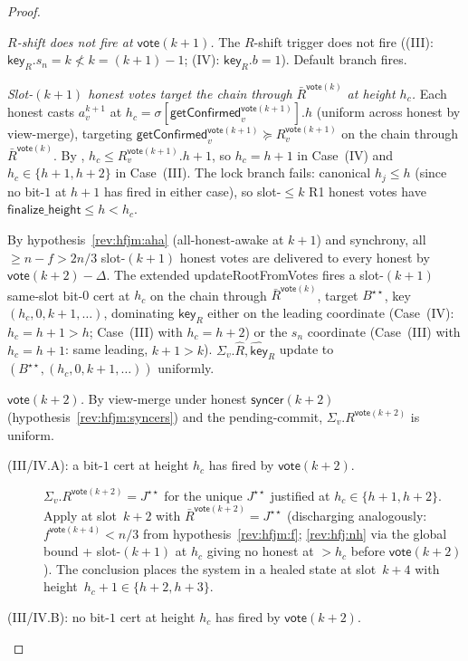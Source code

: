 \documentclass{article}
\newcommand{\finalizeHeight}{\mathsf{finalize\_height}}
\newcommand{\key}{\mathsf{key}}
\newcommand{\syncer}{\mathsf{syncer}}
\newcommand{\vote}{\mathsf{vote}}
\newcommand{\comm}[1]{\bar{#1}}
\newcommand{\updateRootFromVotes}{\textsf{updateRootFromVotes}\xspace}
\newcommand{\getConfirmed}{\textsf{getConfirmed}\xspace}
\theoremstyle{plain}
\theoremstyle{definition}
\theoremstyle{remark}
\newcommand{\AHA}{all-honest-awake\xspace}
\begin{document}
\begin{proof}
\begin{description}
\emph{$R$-shift does not fire at $\vote(k+1)$.}
The $R$-shift trigger does not fire ((III): $\key_R.s_n = k \not< k = (k+1)-1$; (IV): $\key_R.b = 1$). Default branch fires.

\emph{Slot-$(k+1)$ honest votes target the chain through $\comm{R}^{\vote(k)}$ at height $h_c$.}
Each honest casts $a^{k+1}_v$ at $h_c = \sigma[\getConfirmed_v^{\vote(k+1)}].h$ (uniform across honest by view-merge), targeting $\getConfirmed_v^{\vote(k+1)} \succeq R_v^{\vote(k+1)}$ on the chain through $\comm{R}^{\vote(k)}$. By , $h_c \leq R_v^{\vote(k+1)}.h + 1$, so $h_c = h+1$ in Case~(IV) and $h_c \in \{h+1, h+2\}$ in Case~(III). The lock branch fails: canonical $h_j \leq h$ (since no bit-$1$ at $h+1$ has fired in either case), so slot-$\leq k$ R1 honest votes have $\finalizeHeight \leq h < h_c$.

By hypothesis~\ref{rev:hfjm:aha} (\AHA at $k+1$) and synchrony, all $\geq n - f > 2n/3$ slot-$(k+1)$ honest votes are delivered to every honest by $\vote(k+2) - \Delta$. The extended \updateRootFromVotes{} fires a slot-$(k+1)$ same-slot bit-$0$ cert at $h_c$ on the chain through $\comm{R}^{\vote(k)}$, target $B^{\star\star}$, key $(h_c, 0, k+1, \ldots)$, dominating $\key_R$ either on the leading coordinate (Case~(IV): $h_c = h+1 > h$; Case~(III) with $h_c = h+2$) or the $s_n$ coordinate (Case~(III) with $h_c = h+1$: same leading, $k+1 > k$). $\Sigma_v.\hat{R}, \hat{\key}_R$ update to $(B^{\star\star}, (h_c, 0, k+1, \ldots))$ uniformly.

\emph{$\vote(k+2)$.}
By view-merge under honest $\syncer(k+2)$ (hypothesis~\ref{rev:hfjm:syncers}) and the pending-commit, $\Sigma_v.R^{\vote(k+2)}$ is uniform.

\begin{description}
\item[{(III/IV.A): a bit-$1$ cert at height $h_c$ has fired by $\vote(k+2)$.}]\hfill

$\Sigma_v.R^{\vote(k+2)} = J^{\star\star}$ for the unique $J^{\star\star}$ justified at $h_c \in \{h+1, h+2\}$. Apply  at slot~$k+2$ with $\comm{R}^{\vote(k+2)} = J^{\star\star}$ (discharging analogously: $f^{\vote(k+4)} < n/3$ from hypothesis~\ref{rev:hfjm:f}; \ref{rev:hfj:nh} via the global bound + slot-$(k+1)$ at $h_c$ giving no honest at $> h_c$ before $\vote(k+2)$). The conclusion places the system in a healed state at slot~$k+4$ with height~$h_c + 1 \in \{h+2, h+3\}$.

\item[{(III/IV.B): no bit-$1$ cert at height $h_c$ has fired by $\vote(k+2)$.}]\hfill


\end{description}
\end{description}
\end{proof}
\end{document}
